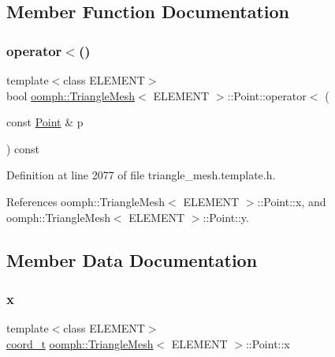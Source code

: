 \subsection{Member Function Documentation}
\mbox{\label{structoomph_1_1TriangleMesh_1_1Point_a51a65a16bcb72e3b18102f0ab8001d0c}} 
\subsubsection{\texorpdfstring{operator$<$()}{operator<()}}
{\footnotesize\ttfamily template$<$class E\+L\+E\+M\+E\+NT$>$ \\
bool \hyperlink{classoomph_1_1TriangleMesh}{oomph\+::\+Triangle\+Mesh}$<$ E\+L\+E\+M\+E\+NT $>$\+::Point\+::operator$<$ (\begin{DoxyParamCaption}\item[{const \hyperlink{structoomph_1_1TriangleMesh_1_1Point}{Point} \&}]{p }\end{DoxyParamCaption}) const\hspace{0.3cm}{\ttfamily [inline]}}



Definition at line 2077 of file triangle\+\_\+mesh.\+template.\+h.



References oomph\+::\+Triangle\+Mesh$<$ E\+L\+E\+M\+E\+N\+T $>$\+::\+Point\+::x, and oomph\+::\+Triangle\+Mesh$<$ E\+L\+E\+M\+E\+N\+T $>$\+::\+Point\+::y.



\subsection{Member Data Documentation}
\mbox{\label{structoomph_1_1TriangleMesh_1_1Point_a3d99bdf85c838801260dda624a518133}} 
\subsubsection{\texorpdfstring{x}{x}}
{\footnotesize\ttfamily template$<$class E\+L\+E\+M\+E\+NT$>$ \\
\hyperlink{classoomph_1_1TriangleMesh_ad50b14a66b40a3bfb22a43df86c9006e}{coord\+\_\+t} \hyperlink{classoomph_1_1TriangleMesh}{oomph\+::\+Triangle\+Mesh}$<$ E\+L\+E\+M\+E\+NT $>$\+::Point\+::x}



